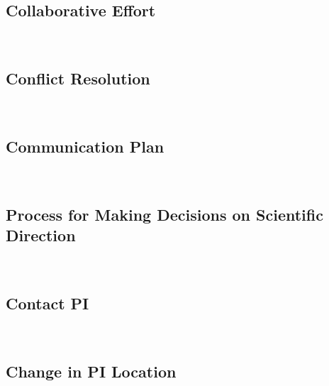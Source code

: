 \subsection*{Collaborative Effort}

\lipsum[66]

~

\subsection*{Conflict Resolution}

\lipsum[66]

~

\subsection*{Communication Plan}

\lipsum[66]

~

\subsection*{Process for Making Decisions on Scientific Direction}

\lipsum[66]

~

\subsection*{Contact PI}

\lipsum[66]

~

\subsection*{Change in PI Location}

